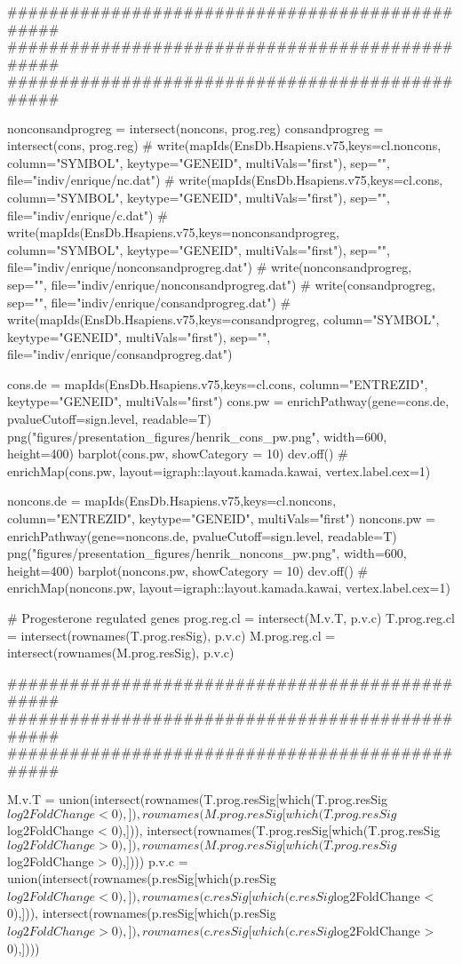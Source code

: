 \documentclass[10pt, twocolumn]{article}\usepackage[]{graphicx}\usepackage[]{color}
\theoremstyle{plain}
\begin{document}
\begin{Schunk}
\begin{Sinput}
################################################
################################################
################################################

nonconsandprogreg = intersect(noncons, prog.reg)
consandprogreg    = intersect(cons,    prog.reg)
# write(mapIds(EnsDb.Hsapiens.v75,keys=cl.noncons, column="SYMBOL", keytype="GENEID", multiVals="first"), sep="\n", file="indiv/enrique/nc.dat")
# write(mapIds(EnsDb.Hsapiens.v75,keys=cl.cons, column="SYMBOL", keytype="GENEID", multiVals="first"), sep="\n", file="indiv/enrique/c.dat")
# write(mapIds(EnsDb.Hsapiens.v75,keys=nonconsandprogreg, column="SYMBOL", keytype="GENEID", multiVals="first"), sep="\n", file="indiv/enrique/nonconsandprogreg.dat")
# write(nonconsandprogreg, sep="\n", file="indiv/enrique/nonconsandprogreg.dat")
# write(consandprogreg, sep="\n",    file="indiv/enrique/consandprogreg.dat")
# write(mapIds(EnsDb.Hsapiens.v75,keys=consandprogreg, column="SYMBOL", keytype="GENEID", multiVals="first"), sep="\n", file="indiv/enrique/consandprogreg.dat")

cons.de = mapIds(EnsDb.Hsapiens.v75,keys=cl.cons, column="ENTREZID", keytype="GENEID", multiVals="first")
cons.pw = enrichPathway(gene=cons.de, pvalueCutoff=sign.level, readable=T)
png("figures/presentation_figures/henrik_cons_pw.png", width=600, height=400)
barplot(cons.pw, showCategory = 10)
dev.off()
# enrichMap(cons.pw, layout=igraph::layout.kamada.kawai, vertex.label.cex=1)

noncons.de = mapIds(EnsDb.Hsapiens.v75,keys=cl.noncons, column="ENTREZID", keytype="GENEID", multiVals="first")
noncons.pw = enrichPathway(gene=noncons.de, pvalueCutoff=sign.level, readable=T)
png("figures/presentation_figures/henrik_noncons_pw.png", width=600, height=400)
barplot(noncons.pw, showCategory = 10)
dev.off()
# enrichMap(noncons.pw, layout=igraph::layout.kamada.kawai, vertex.label.cex=1)

# Progesterone regulated genes
prog.reg.cl   = intersect(M.v.T, p.v.c)
T.prog.reg.cl = intersect(rownames(T.prog.resSig), p.v.c)
M.prog.reg.cl = intersect(rownames(M.prog.resSig), p.v.c)

################################################
################################################
################################################

M.v.T = union(intersect(rownames(T.prog.resSig[which(T.prog.resSig$log2FoldChange < 0),]), rownames(M.prog.resSig[which(T.prog.resSig$log2FoldChange < 0),])),
              intersect(rownames(T.prog.resSig[which(T.prog.resSig$log2FoldChange > 0),]), rownames(M.prog.resSig[which(T.prog.resSig$log2FoldChange > 0),])))
p.v.c = union(intersect(rownames(p.resSig[which(p.resSig$log2FoldChange < 0),]),           rownames(c.resSig[which(c.resSig$log2FoldChange < 0),])),
              intersect(rownames(p.resSig[which(p.resSig$log2FoldChange > 0),]),           rownames(c.resSig[which(c.resSig$log2FoldChange > 0),])))


\end{Sinput}
\end{Schunk}
\end{document}
